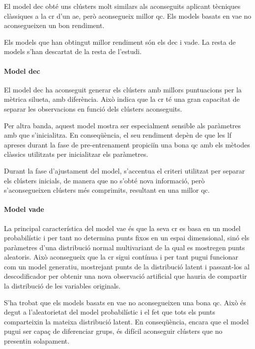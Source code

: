 \documentclass[CAT,BIB]{TFUOC}%
\begin{document}
    El model \gls{dec} obté uns clústers molt similars
    als aconseguits aplicant tècniques clàssiques a la \gls{cr} d'un \gls{ae},
    però aconsegueix millor \gls{qc}.
    Els models basats en \gls{vae} no aconsegueixen un bon rendiment.

    Els models que han obtingut millor rendiment
    són els \gls{dec} i \gls{vade}.
    La resta de models s'han descartat
    de la resta de l'estudi.


    \paragraph{Model \gls{dec}}
        El model \gls{dec} ha aconseguit generar
        els clústers amb millors puntuacions per la mètrica silueta,
        amb diferència.
        Això indica que la \gls{cr} té una gran capacitat
        de separar les observacions en funció dels clústers aconseguits.

        Per altra banda,
        aquest model mostra ser especialment sensible
        als paràmetres amb que s'inicialitza.
        En conseqüència,
        el seu rendiment depèn de que les \gls{lf} apreses durant la fase de pre-entrenament
        propiciïn una bona \gls{qc} amb els mètodes clàssics
        utilitzats per inicialitzar els paràmetres.

        Durant la fase d'ajustament del model,
        s'accentua el criteri utilitzat per separar els clústers inicials,
        de manera que no s'obté nova informació,
        però s'aconsegueixen clústers més comprimits,
        resultant en una millor \gls{qc}.


    \paragraph{Model \gls{vade}}
        La principal característica del model \gls{vae}
        és que la seva \gls{cr} es basa en un model probabilístic
        i per tant no determina punts fixos en un espai dimensional,
        sinó els paràmetres d'una distribució normal multivariant
        de la qual es mostregen punts aleatoris.
        Això aconsegueix que la \gls{cr} sigui contínua
        i per tant pugui funcionar com un model generatiu,
        mostrejant punts de la distribució latent
        i passant-los al descodificador
        per obtenir una nova observació artificial
        que hauria de compartir la distribució de les variables originals.

        S'ha trobat que els models basats en \gls{vae}
        no aconsegueixen una bona \gls{qc}.
        Això és degut a l'aleatorietat del model probabilístic
        i el fet que tots els punts comparteixin la mateixa distribució latent.
        En conseqüència,
        encara que el model pugui ser capaç de diferenciar grups,
        és difícil aconseguir clústers que no presentin solapament.
\end{document}
